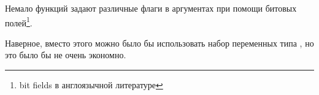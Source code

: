 \chapterold{\BitfieldsChapter}
\label{sec:bitfields}

Немало функций задают различные флаги в аргументах при помощи битовых полей\footnote{bit fields в англоязычной литературе}.

Наверное, вместо этого можно было бы использовать набор переменных типа \Tbool, но это было бы 
не очень экономно.








